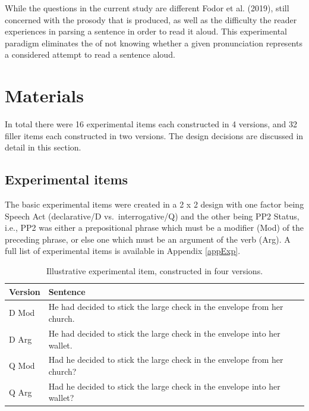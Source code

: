 \documentclass[12pt,oneside]{book}
\begin{document}
While the questions  in the current study  are different  Fodor et al. (2019),  still concerned with the prosody that is produced, as well as the  difficulty the reader experiences in parsing a sentence in order to read it aloud. This experimental paradigm eliminates the  of not knowing whether a given pronunciation represents a  considered  attempt to read a sentence aloud.

\hypertarget{mat}{%
\section{Materials}\label{mat}}

In total there were 16 experimental items each constructed in 4 versions, and 32 filler items each constructed in two versions. The design decisions are discussed in detail in this section.

\hypertarget{experimental-items}{%
\subsection{Experimental items}\label{experimental-items}}

The basic experimental items were created in a 2 x 2 design with one factor being Speech Act (declarative/D vs.~interrogative/Q) and the other being PP2 Status, i.e., PP2 was either a prepositional phrase which must be a modifier (Mod) of the preceding phrase, or else one which must be an argument of the verb (Arg). A full list of experimental items is available in Appendix \ref{appExp}.

\begin{table}[H]

\caption{\label{tab:sentences}Illustrative experimental item, constructed in four versions.}
\centering
\begin{tabular}{ll}
\toprule
Version & Sentence\\
\midrule
D Mod & He had decided to stick the large check in the envelope from her church.\\
D Arg & He had decided to stick the large check in the envelope into her wallet.\\
Q Mod & Had he decided to stick the large check in the envelope from her church?\\
Q Arg & Had he decided to stick the large check in the envelope into her wallet?\\
\bottomrule
\end{tabular}
\end{table}
\end{document}
